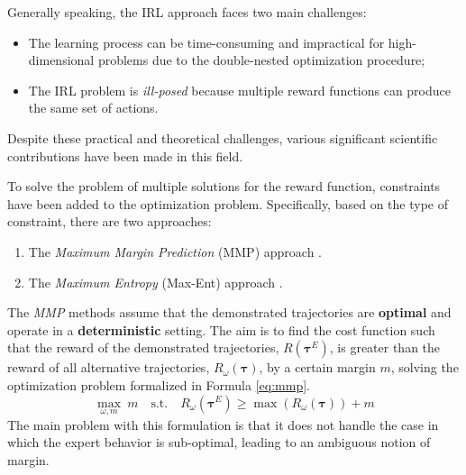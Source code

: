 

Generally speaking, the IRL approach faces two main challenges:
\begin{itemize}
    \item The learning process can be time-consuming and impractical for high-dimensional problems due to the double-nested optimization procedure;
    \item The IRL problem is \textit{ill-posed} because multiple reward functions can produce the same set of actions.
\end{itemize}

Despite these practical and theoretical challenges, various significant scientific contributions have been made in this field.

To solve the problem of multiple solutions for the reward function, constraints have been added to the optimization problem. Specifically, based on the type of constraint, there are two approaches:
\begin{enumerate}[label=\textbf{(\alph*)}]
    \item The \textit{Maximum Margin Prediction} (MMP) approach \cite{ratliff2006maximum_margin,ratliff2009learning_to_search}.
    \item The \textit{Maximum Entropy} (Max-Ent) approach \cite{ziebart2008maximum_entropy,wulfmeier2015deep_inverse_rl,finn2016guided_cost_learning}.
\end{enumerate}

The \textit{MMP} methods assume that the demonstrated trajectories are \textbf{optimal} and operate in a \textbf{deterministic} setting. The aim is to find the cost function such that the reward of the demonstrated trajectories, $R(\boldsymbol{\tau}^{E})$, is greater than the reward of all alternative trajectories, $R_{\omega}(\boldsymbol{\tau})$, by a certain margin $m$, solving the optimization problem formalized in Formula \ref{eq:mmp}.
\begin{equation}
\label{eq:mmp}
\underset{\omega, m}{\max} \ m \quad \text{s.t.} \quad R_{\omega}(\boldsymbol{\tau}^{E}) \geq \max (R_{\omega}(\boldsymbol{\tau})) + m
\end{equation}
The main problem with this formulation is that it does not handle the case in which the expert behavior is sub-optimal, leading to an ambiguous notion of margin.

